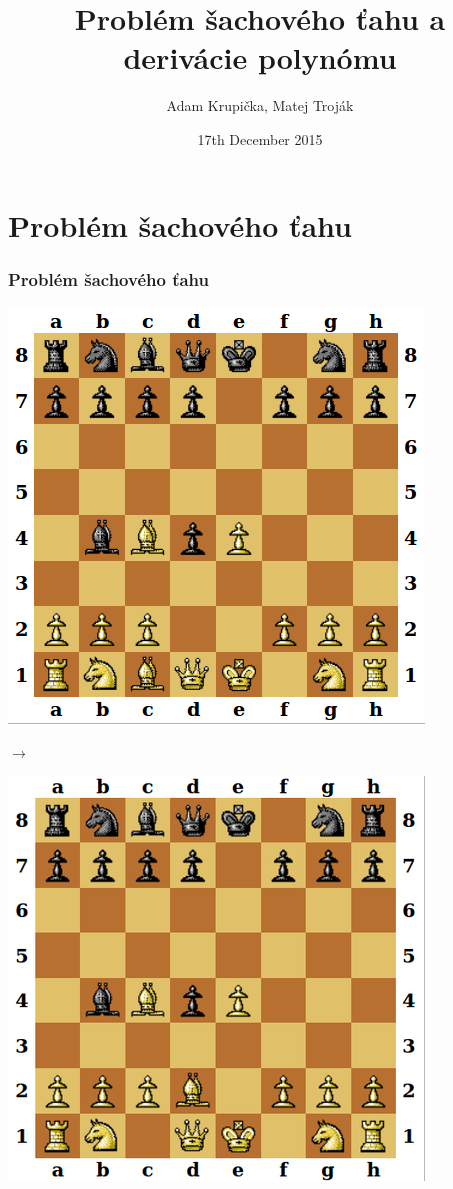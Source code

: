 \documentclass[red]{beamer}
\title{Problém šachového ťahu a derivácie polynómu}
\author{Adam Krupička, Matej Troják}
\institute{FI MUNI}
\date{17th December 2015}
\begin{document}
\begin{frame}
  \titlepage
\end{frame}

\section{Problém šachového ťahu}

\begin{frame}
\frametitle{Problém šachového ťahu} 
\begin{center}
\begin{minipage}{0.4\textwidth}
\begin{center}
\includegraphics[scale=0.25]{to}
\end{center}
\end{minipage}%
\begin{minipage}{0.1\textwidth}
\begin{center}
$\longrightarrow$
\end{center}
\end{minipage}
\begin{minipage}{0.4\textwidth}
\begin{center}
\includegraphics[scale=0.25]{from}

\end{center}
\end{minipage}
\end{center}
\end{frame}
\end{document}
